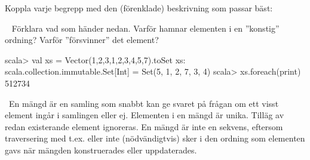 
\ifPreSolution


\Exercise{\ExeWeekSEVEN}\label{exe:W07}

\begin{Goals}

\end{Goals}

\begin{Preparations}
\item {}
\end{Preparations}

\else

\ExerciseSolution{\ExeWeekSEVEN}

\fi



\BasicTasks %





\QUESTBEGIN

\Task \what

\vspace{1em}\noindent Koppla varje begrepp med den (förenklade) beskrivning som passar bäst:

\begin{ConceptConnections}

\end{ConceptConnections}

\SOLUTION

\TaskSolved \what

\begin{ConceptConnections}

\end{ConceptConnections}

\QUESTEND


\QUESTBEGIN

\Task \what~ Förklara vad som händer nedan. Varför hamnar elementen i en ''konstig'' ordning? Varför ''försvinner'' det element?

\begin{REPL}
scala> val xs = Vector(1,2,3,1,2,3,4,5,7).toSet
xs: scala.collection.immutable.Set[Int] = Set(5, 1, 2, 7, 3, 4)
scala> xs.foreach(print)
512734
\end{REPL}

\SOLUTION

\TaskSolved \what~En mängd är en samling som snabbt kan ge svaret på frågan om ett visst element ingår i samlingen eller ej. Elementen i en mängd är unika. Tilläg av redan existerande element ignoreras. En mängd är inte en  sekvens, eftersom traversering med t.ex.  eller  inte (nödvändigtvis) sker i den ordning som elementen gavs när mängden konstruerades eller uppdaterades.

